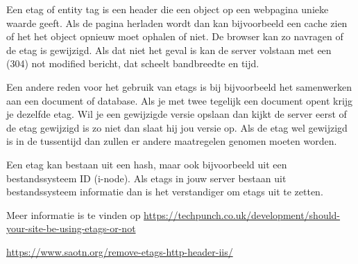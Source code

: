 Een etag of entity tag is een header die een object op een webpagina unieke waarde geeft. Als de pagina herladen wordt dan kan bijvoorbeeld een cache zien of het het object opnieuw moet ophalen of niet. De browser kan zo navragen of de etag is gewijzigd. Als dat niet het geval is kan de server volstaan met een (304) not modified bericht, dat scheelt bandbreedte en tijd.

Een andere reden voor het gebruik van etags is bij bijvoorbeeld het samenwerken aan een document of database. Als je met twee tegelijk een document opent krijg je dezelfde etag. Wil je een gewijzigde versie opslaan dan kijkt de server eerst of de etag gewijzigd is zo niet dan slaat hij jou versie op. Als de etag wel gewijzigd is in de tussentijd dan zullen er andere maatregelen genomen moeten worden.

Een etag kan bestaan uit een hash, maar ook bijvoorbeeld uit een bestandssysteem ID (i-node). Als etags in jouw server bestaan uit bestandssysteem informatie dan is het verstandiger om etags uit te zetten.

Meer informatie is te vinden op \url{https://techpunch.co.uk/development/should-your-site-be-using-etags-or-not}

\url{https://www.saotn.org/remove-etags-http-header-iis/}
